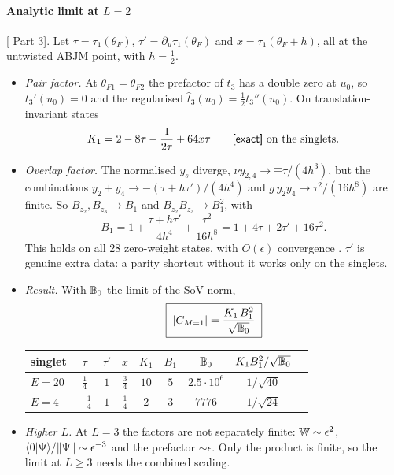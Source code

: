 \paragraph{Analytic limit at $L=2$} [ Part 3]. Let $\tau=\tau_1(\theta_F)$, $\tau'=\partial_u\tau_1(\theta_F)$
and $x=\tau_1(\theta_F+h)$, all at the untwisted ABJM point, with $h=\tfrac12$.
\begin{itemize}
\item \emph{Pair factor.} At $\theta_{F1}=\theta_{F2}$ the prefactor of $t_3$ has a double zero at $u_0$, so $t_3'(u_0)=0$ and the
  regularised $\hat t_3(u_0)=\tfrac12t_3''(u_0)$. On translation-invariant states
  \begin{equation}
  K_1=2-8\tau-\frac1{2\tau}+64x\tau \qquad\text{\textsf{[exact]}\ on the singlets}.
  \end{equation}
\item \emph{Overlap factor.} The normalised $y_s$ diverge, $\nu y_{2,4}\to\mp\tau/(4h^3)$, but the combinations
  $y_2+y_4\to-(\tau+h\tau')/(4h^4)$ and $g\,y_2y_4\to\tau^2/(16h^8)$ are finite. So $B_{z_2},B_{z_3}\to B_1$ and
  $B_{z_2}B_{z_3}\to B_1^2$, with
  \begin{equation}
  B_1=1+\frac{\tau+h\tau'}{4h^4}+\frac{\tau^2}{16h^8}=1+4\tau+2\tau'+16\tau^2 .
  \end{equation}
  This holds on all 28 zero-weight states, with $O(\epsilon)$ convergence \hp. $\tau'$ is genuine extra data: a parity shortcut
  without it works only on the singlets.
\item \emph{Result.} With $\mathbb B_0$ the limit of the SoV norm,
  \begin{equation}
  \boxed{\;|C_{M=1}|=\frac{K_1\,B_1^2}{\sqrt{\mathbb B_0}}\;}
  \end{equation}
  \begin{center}
  \begin{tabular}{lcccccccc}
  \toprule
  singlet & $\tau$ & $\tau'$ & $x$ & $K_1$ & $B_1$ & $\mathbb B_0$ & $K_1B_1^2/\sqrt{\mathbb B_0}$\\
  \midrule
  $E=20$ & $\tfrac14$ & $1$ & $\tfrac34$ & $10$ & $5$ & $2.5\cdot10^6$ & $1/\sqrt{40}$\\
  $E=4$ & $-\tfrac14$ & $1$ & $\tfrac14$ & $2$ & $3$ & $7776$ & $1/\sqrt{24}$\\
  \bottomrule
  \end{tabular}
  \end{center}
\item \emph{Higher $L$.} At $L=3$ the factors are not separately finite: $\mathbb W\sim\epsilon^2$,
  $\langle0|\Psi\rangle/\|\Psi\|\sim\epsilon^{-3}$ and the prefactor $\sim\epsilon$. Only the product is finite, so the limit at $L\ge3$ needs
  the combined scaling.
\end{itemize}

